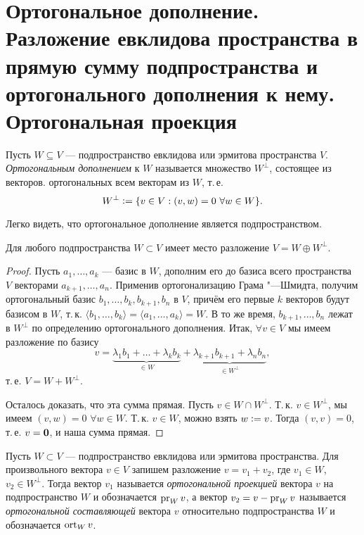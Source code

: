 \section{Ортогональное дополнение. Разложение евклидова пространства в прямую сумму подпространства и ортогонального дополнения к нему. Ортогональная проекция}

\begin{definition}
    Пусть $W \subseteq V$ --- подпространство евклидова или эрмитова пространства $V$. \textit{Ортогональным дополнением} к $W$ называется множество $W^\perp$, состоящее из векторов. ортогональных всем векторам из $W$, т.\,е.
    \[
        W^\perp \vcentcolon = \{v \in V : (v, w) = 0\ \forall w \in W\}.
    \]
\end{definition}

Легко видеть, что ортогональное дополнение является подпространством.

\begin{proposal}
    Для любого подпространства $W \subset V$ имеет место разложение $V = W \oplus W^\perp$.
\end{proposal}

\begin{proof}
    Пусть $a_1, \ldots, a_k$ --- базис в $W$, дополним его до базиса всего пространства $V$ векторами $a_{k + 1}, \ldots, a_n$. Применив ортогонализацию Грама "---Шмидта, получим ортогональный базис $b_1, \ldots, b_k, b_{k + 1}, b_n$ в $V$, причём его первые $k$ векторов будут базисом в $W$, т.\,к. $\langle b_1, \ldots, b_k\rangle = \langle a_1, \ldots, a_k\rangle = W$. В то же время, $b_{k + 1}, \ldots, b_n$ лежат в $W^\perp$ по определению ортогонального дополнения. Итак, $\forall v \in V$ мы имеем разложение по базису
    \[
        v = \underbrace{\lambda_1b_1 + \ldots + \lambda_kb_k}_{{} \in W} + \underbrace{\lambda_{k + 1}b_{k + 1} + \lambda_nb_n}_{{} \in W^\perp},
    \]
    т.\,е. $V = W + W^\perp$.

    Осталось доказать, что эта сумма прямая. Пусть $v \in W \cap W^\perp$. Т.\,к. $v \in W^\perp$, мы имеем $(v, w) = 0$ $\forall w \in W$. Т.\,к. $v \in W$, можно взять $w \vcentcolon = v$. Тогда $(v, v) = 0$, т.\,е. $v = \boldsymbol{0}$, и наша сумма прямая.
\end{proof}

\begin{definition}
    Пусть $W \subset V$ --- подпространство евклидова или эрмитова пространства. Для произвольного вектора $v \in V$ запишем разложение $v = v_1 + v_2$, где $v_1 \in W$, $v_2 \in W^\perp$. Тогда вектор $v_1$ называется \textit{ортогональной проекцией} вектора $v$ на подпространство $W$ и обозначается $\operatorname{pr}_Wv$, а вектор $v_2 = v - \operatorname{pr}_Wv$ называется \textit{ортогональной составляющей} вектора $v$ относительно подпространства $W$ и обозначается $\operatorname{ort}_Wv$.
\end{definition}


